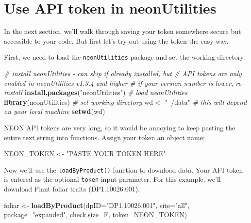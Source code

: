 \documentclass[]{book}
\newenvironment{Shaded}{\begin{snugshade}}{\end{snugshade}}
\newcommand{\CommentTok}[1]{\textcolor[rgb]{0.56,0.35,0.01}{\textit{#1}}}
\newcommand{\DataTypeTok}[1]{\textcolor[rgb]{0.13,0.29,0.53}{#1}}
\newcommand{\KeywordTok}[1]{\textcolor[rgb]{0.13,0.29,0.53}{\textbf{#1}}}
\newcommand{\NormalTok}[1]{#1}
\newcommand{\StringTok}[1]{\textcolor[rgb]{0.31,0.60,0.02}{#1}}
\begin{document}
\hypertarget{use-api-token-in-neonutilities}{%
\section{Use API token in neonUtilities}\label{use-api-token-in-neonutilities}}

In the next section, we'll walk through saving your token somewhere secure but
accessible to your code. But first let's try out using the token the easy way.

First, we need to load the \texttt{neonUtilities} package and set the working
directory:

\begin{Shaded}
\begin{Highlighting}[]
\CommentTok{# install neonUtilities - can skip if already installed, but}
\CommentTok{# API tokens are only enabled in neonUtilities v1.3.4 and higher}
\CommentTok{# if your version number is lower, re-install}
\KeywordTok{install.packages}\NormalTok{(}\StringTok{"neonUtilities"}\NormalTok{)}
\CommentTok{# load neonUtilities}
\KeywordTok{library}\NormalTok{(neonUtilities)}
\CommentTok{# set working directory}
\NormalTok{wd <-}\StringTok{ "~/data"} \CommentTok{# this will depend on your local machine}
\KeywordTok{setwd}\NormalTok{(wd)}
\end{Highlighting}
\end{Shaded}

NEON API tokens are very long, so it would be annoying to keep pasting the
entire text string into functions. Assign your token an object name:

\begin{Shaded}
\begin{Highlighting}[]
\NormalTok{NEON_TOKEN <-}\StringTok{ "PASTE YOUR TOKEN HERE"}
\end{Highlighting}
\end{Shaded}

Now we'll use the \texttt{loadByProduct()} function to download data. Your
API token is entered as the optional \texttt{token} input parameter. For
this example, we'll download Plant foliar traits (DP1.10026.001).

\begin{Shaded}
\begin{Highlighting}[]
\NormalTok{foliar <-}\StringTok{ }\KeywordTok{loadByProduct}\NormalTok{(}\DataTypeTok{dpID=}\StringTok{"DP1.10026.001"}\NormalTok{, }\DataTypeTok{site=}\StringTok{"all"}\NormalTok{, }
                        \DataTypeTok{package=}\StringTok{"expanded"}\NormalTok{, }\DataTypeTok{check.size=}\NormalTok{F,}
                        \DataTypeTok{token=}\NormalTok{NEON_TOKEN)}
\end{Highlighting}
\end{Shaded}
\end{document}
